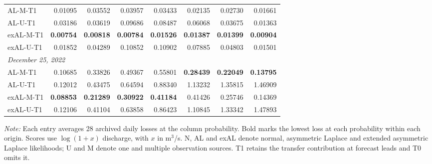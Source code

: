 \begin{table}[!htbp]
\begin{threeparttable}
\begin{tabular}{lrrrrrrr}
AL-M-T1 & 0.01095 & 0.03552 & 0.03957 & 0.03433 & 0.02135 & 0.02730 & 0.01661 \\
AL-U-T1 & 0.03186 & 0.03619 & 0.09686 & 0.08487 & 0.06068 & 0.03675 & 0.01363 \\
exAL-M-T1 & \textbf{0.00754} & \textbf{0.00818} & \textbf{0.00784} & \textbf{0.01526} & \textbf{0.01387} & \textbf{0.01399} & \textbf{0.00904} \\
exAL-U-T1 & 0.01852 & 0.04289 & 0.10852 & 0.10902 & 0.07885 & 0.04803 & 0.01501 \\
\multicolumn{8}{l}{\textit{December 25, 2022}} \\
AL-M-T1 & 0.10685 & 0.33826 & 0.49367 & 0.55801 & \textbf{0.28439} & \textbf{0.22049} & \textbf{0.13795} \\
AL-U-T1 & 0.12012 & 0.43475 & 0.64594 & 0.88340 & 1.13232 & 1.35815 & 1.46909 \\
exAL-M-T1 & \textbf{0.08853} & \textbf{0.21289} & \textbf{0.30922} & \textbf{0.41184} & 0.41426 & 0.25746 & 0.14369 \\
exAL-U-T1 & 0.12106 & 0.41104 & 0.63858 & 0.86423 & 1.10845 & 1.33342 & 1.47893 \\
\hline
\end{tabular}
\begin{tablenotes}\footnotesize
\item \textit{Note:} Each entry averages 28 archived daily losses at the column probability. Bold marks the lowest loss at each probability within each origin. Scores use $\log(1+x)$ discharge, with $x$ in m$^3$/s. N, AL and exAL denote normal, asymmetric Laplace and extended asymmetric Laplace likelihoods; U and M denote one and multiple observation sources. T1 retains the transfer contribution at forecast leads and T0 omits it.
\end{tablenotes}
\end{threeparttable}
\end{table}
